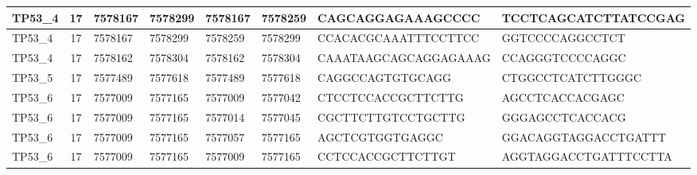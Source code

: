 \begin{landscape}
\begin{longtable}{| p{} | p{} | p{} | p{} | p{} | p{} | p{} | p{} |}
\multicolumn{1}{|l|}{TP53\_4}    & \multicolumn{1}{c|}{17} & \multicolumn{1}{l|}{7578167}   & \multicolumn{1}{l|}{7578299}   & \multicolumn{1}{l|}{7578167}   & \multicolumn{1}{l|}{7578259}   & \multicolumn{1}{l|}{CAGCAGGAGAAAGCCCC}               & \multicolumn{1}{l|}{TCCTCAGCATCTTATCCGAG}          \\ \hline
\multicolumn{1}{|l|}{TP53\_4}    & \multicolumn{1}{c|}{17} & \multicolumn{1}{l|}{7578167}   & \multicolumn{1}{l|}{7578299}   & \multicolumn{1}{l|}{7578259}   & \multicolumn{1}{l|}{7578299}   & \multicolumn{1}{l|}{CCACACGCAAATTTCCTTCC}            & \multicolumn{1}{l|}{GGTCCCCAGGCCTCT}               \\ \hline
\multicolumn{1}{|l|}{TP53\_4}    & \multicolumn{1}{c|}{17} & \multicolumn{1}{l|}{7578162}   & \multicolumn{1}{l|}{7578304}   & \multicolumn{1}{l|}{7578162}   & \multicolumn{1}{l|}{7578304}   & \multicolumn{1}{l|}{CAAATAAGCAGCAGGAGAAAG}           & \multicolumn{1}{l|}{CCAGGGTCCCCAGGC}               \\ \hline
\multicolumn{1}{|l|}{TP53\_5}    & \multicolumn{1}{c|}{17} & \multicolumn{1}{l|}{7577489}   & \multicolumn{1}{l|}{7577618}   & \multicolumn{1}{l|}{7577489}   & \multicolumn{1}{l|}{7577618}   & \multicolumn{1}{l|}{CAGGCCAGTGTGCAGG}                & \multicolumn{1}{l|}{CTGGCCTCATCTTGGGC}             \\ \hline
\multicolumn{1}{|l|}{TP53\_6}    & \multicolumn{1}{c|}{17} & \multicolumn{1}{l|}{7577009}   & \multicolumn{1}{l|}{7577165}   & \multicolumn{1}{l|}{7577009}   & \multicolumn{1}{l|}{7577042}   & \multicolumn{1}{l|}{CTCCTCCACCGCTTCTTG}              & \multicolumn{1}{l|}{AGCCTCACCACGAGC}               \\ \hline
\multicolumn{1}{|l|}{TP53\_6}    & \multicolumn{1}{c|}{17} & \multicolumn{1}{l|}{7577009}   & \multicolumn{1}{l|}{7577165}   & \multicolumn{1}{l|}{7577014}   & \multicolumn{1}{l|}{7577045}   & \multicolumn{1}{l|}{CGCTTCTTGTCCTGCTTG}              & \multicolumn{1}{l|}{GGGAGCCTCACCACG}               \\ \hline
\multicolumn{1}{|l|}{TP53\_6}    & \multicolumn{1}{c|}{17} & \multicolumn{1}{l|}{7577009}   & \multicolumn{1}{l|}{7577165}   & \multicolumn{1}{l|}{7577057}   & \multicolumn{1}{l|}{7577165}   & \multicolumn{1}{l|}{AGCTCGTGGTGAGGC}                 & \multicolumn{1}{l|}{GGACAGGTAGGACCTGATTT}          \\ \hline
\multicolumn{1}{|l|}{TP53\_6}    & \multicolumn{1}{c|}{17} & \multicolumn{1}{l|}{7577009}   & \multicolumn{1}{l|}{7577165}   & \multicolumn{1}{l|}{7577009}   & \multicolumn{1}{l|}{7577165}   & \multicolumn{1}{l|}{CCTCCACCGCTTCTTGT}               & \multicolumn{1}{l|}{AGGTAGGACCTGATTTCCTTA}         \\ \hline

\end{longtable}
\end{landscape}
